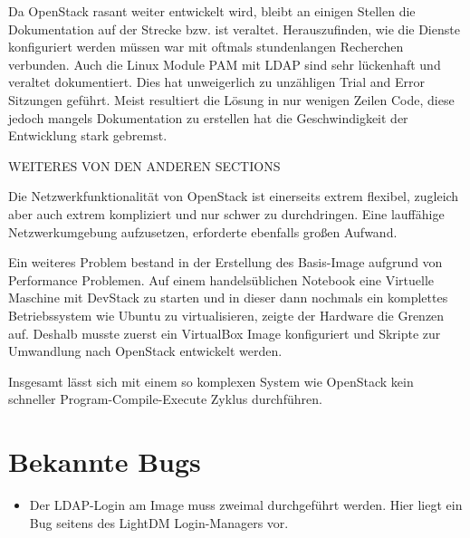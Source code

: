 Da OpenStack rasant weiter entwickelt wird, bleibt an einigen Stellen die Dokumentation auf der Strecke bzw. ist veraltet. 
Herauszufinden, wie die Dienste konfiguriert werden müssen war mit oftmals stundenlangen Recherchen verbunden.
Auch die Linux Module PAM mit LDAP sind sehr lückenhaft und veraltet dokumentiert.
Dies hat unweigerlich zu unzähligen Trial and Error Sitzungen geführt.
Meist resultiert die Lösung in nur wenigen Zeilen Code, diese jedoch mangels Dokumentation zu erstellen hat die Geschwindigkeit der Entwicklung stark gebremst.



WEITERES VON DEN ANDEREN SECTIONS


Die Netzwerkfunktionalität von OpenStack ist einerseits extrem flexibel, zugleich aber auch extrem kompliziert und nur schwer zu durchdringen.
Eine lauffähige Netzwerkumgebung aufzusetzen, erforderte ebenfalls großen Aufwand.

Ein weiteres Problem bestand in der Erstellung des Basis-Image aufgrund von Performance Problemen.
Auf einem handelsüblichen Notebook eine Virtuelle Maschine mit DevStack zu starten und in dieser dann nochmals ein komplettes Betriebssystem wie Ubuntu zu virtualisieren, zeigte der Hardware die Grenzen auf.
Deshalb musste zuerst ein VirtualBox Image konfiguriert und Skripte zur Umwandlung nach OpenStack entwickelt werden.

Insgesamt lässt sich mit einem so komplexen System wie OpenStack kein schneller Program-Compile-Execute Zyklus durchführen.

\section{Bekannte Bugs}

\begin{itemize}
\item Der LDAP-Login am Image muss zweimal durchgeführt werden. Hier liegt ein Bug seitens des LightDM Login-Managers vor.
\end{itemize}